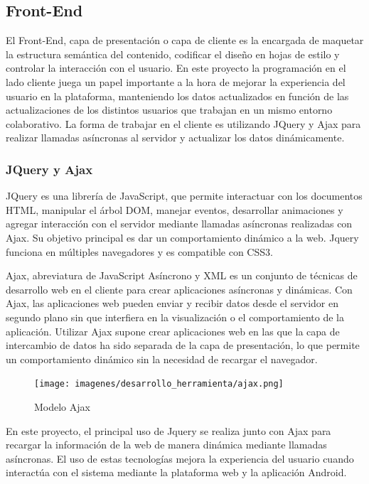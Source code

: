 \documentclass[a4paper,11pt]{book}
\begin{document}
 
\subsection{Front-End}

El Front-End, capa de presentación o capa de cliente es la encargada de maquetar la estructura semántica del contenido, codificar el diseño en hojas de estilo y controlar la interacción con el usuario. En este proyecto la programación en el lado cliente juega un papel importante a la hora de mejorar la experiencia del usuario en la plataforma, manteniendo los datos actualizados en función de las actualizaciones de los distintos usuarios que trabajan en un mismo entorno colaborativo. La forma de trabajar en el cliente es utilizando JQuery y Ajax para realizar llamadas asíncronas al servidor y actualizar los datos dinámicamente.   

\subsubsection{JQuery y Ajax}

JQuery\cite{jq} es una librería de JavaScript, que permite interactuar con los documentos HTML, manipular el árbol DOM, manejar eventos, desarrollar animaciones y agregar interacción con el servidor mediante llamadas asíncronas realizadas con Ajax. Su objetivo principal es dar un comportamiento dinámico a la web. Jquery funciona en múltiples navegadores y es compatible con CSS3.  

Ajax\cite{aj}, abreviatura de JavaScript Asíncrono y XML es un conjunto de técnicas de desarrollo web en el cliente para crear aplicaciones asíncronas y dinámicas. Con Ajax, las aplicaciones web pueden enviar y recibir datos desde el servidor en segundo plano sin que interfiera en la visualización o el comportamiento de la aplicación. Utilizar Ajax supone crear aplicaciones web en las que la capa de intercambio de datos ha sido separada de la capa de presentación, lo que permite un comportamiento dinámico sin la necesidad de recargar el navegador. 

\begin{figure}[H] 
\centering 
\texttt{[image: imagenes/desarrollo\_herramienta/ajax.png]}
\caption{ Modelo Ajax\cite{aj2}  }  
\end{figure}   

En este proyecto, el principal uso de Jquery se realiza junto con Ajax para recargar la información de la web de manera dinámica mediante llamadas asíncronas. El uso de estas tecnologías mejora la experiencia del usuario cuando interactúa con el sistema mediante la plataforma web y la aplicación Android.
\end{document}
